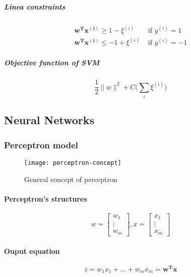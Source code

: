 \documentclass{article}
\begin{document}
					\subparagraph{Linea constraints}
					
						\begin{equation}
							\begin{aligned}
								\boldsymbol{w^T x^{(i)}} \geq 1 - \xi^{(i)} &\mbox{ if }y^{(i)} = 1 \\
								\boldsymbol{w^T x^{(i)}} \leq - 1 + \xi^{(i)} &\mbox{ if }y^{(i)} = -1
							\end{aligned}
						\end{equation}
						
					\subparagraph{Objective function of SVM}
					
						\begin{equation}
							\frac{1}{2} \|w\|^2 + C \Bigg( \sum_i \xi^{(i)} \Bigg)
						\end{equation}

		\subsection{Neural Networks}
		\label{sec:neural-networks}

			\subsubsection{Perceptron model}

			\begin{figure}
				\centering
				\texttt{[image: perceptron-concept]}
				\caption{General concept of perceptron}
				\label{fig:perceptron-concept}
			\end{figure}

			\paragraph{Perceptron's structures}
			\begin{equation}
				w = \begin{bmatrix}
						w_1 \\
						\vdots \\
						w_m
					\end{bmatrix}, x =
					\begin{bmatrix}
						x_1 \\
						\vdots \\
						x_m
					\end{bmatrix}
			\end{equation}

			\paragraph{Ouput equation}
			\begin{equation}
				z = w_1 x_1 + \dots + w_m x_m = \boldsymbol{w^T x}
			\end{equation}
\end{document}
